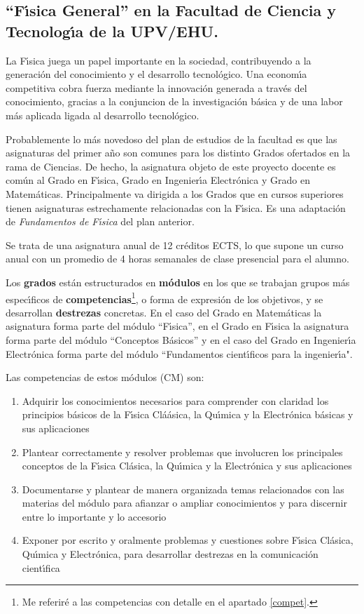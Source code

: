\subsection{ ``F\'{\i}sica General'' en la Facultad de Ciencia y Tecnolog\'{\i}a de la UPV/EHU.}


La F\'{\i}sica juega un papel importante en la sociedad, contribuyendo a 
la generaci\'{o}n del conocimiento y el desarrollo tecnol\'{o}gico.
 Una econom\'{\i}a competitiva  cobra fuerza mediante la
 innovaci\'{o}n generada a trav\'{e}s del conocimiento,
  gracias a la conjuncion de
la investigaci\'{o}n b\'{a}sica y de una labor m\'{a}s aplicada ligada al
 desarrollo tecnol\'{o}gico.


Probablemente lo m\'{a}s novedoso del  plan de estudios de la facultad
es que las asignaturas del primer a\~{n}o  son comunes
para los distinto Grados ofertados en la rama de Ciencias.
De hecho, la asignatura objeto de este proyecto docente es com\'{u}n al
Grado en F\'{\i}sica, Grado en Ingenier\'{\i}a Electr\'{o}nica y Grado en 
 Matem\'{a}ticas.
Principalmente va dirigida  a los Grados  que en cursos
superiores tienen asignaturas
estrechamente relacionadas con la F\'{\i}sica.
Es una adaptaci\'{o}n de {\it Fundamentos de F\'{\i}sica} del
plan anterior.

Se trata de una asignatura  anual de 12 cr\'{e}ditos ECTS, lo 
que supone  un curso anual con un promedio de 
 4 horas semanales de clase presencial para el alumno. 

Los {\bf grados} est\'{a}n estructurados en {\bf m\'{o}dulos}
 en los que se trabajan grupos 
m\'{a}s espec\'{\i}ficos de {\bf competencias}\footnote{Me referir\'{e}
 a las competencias con detalle en el apartado \ref{compet}.},
 o forma de expresi\'{o}n de
 los objetivos,
y se desarrollan {\bf destrezas} concretas.
En el caso del Grado en Matem\'{a}ticas la asignatura forma parte del m\'{o}dulo
 ``F\'{\i}sica'', en el Grado en F\'{\i}sica la asignatura forma parte del m\'{o}dulo
 ``Conceptos
B\'{a}sicos'' y en el caso del Grado en  
Ingenier\'{\i}a Electr\'{o}nica forma parte del m\'{o}dulo
``Fundamentos cient\'{\i}ficos para la ingenier\'{\i}a".


Las competencias de estos m\'{o}dulos (CM) son:
\begin{enumerate} [CM01:]
\item Adquirir los conocimientos necesarios para comprender con claridad los 
principios b\'{a}sicos de la F\'{\i}sica
Cl\'{a}ásica, la Qu\'{\i}mica y la Electr\'{o}nica b\'{a}sicas y sus aplicaciones
\item  Plantear correctamente y resolver problemas que involucren los principales conceptos de la F\'{\i}sica Cl\'{a}sica,
la Qu\'{\i}mica y la Electr\'{o}nica y sus aplicaciones
\item Documentarse y plantear de manera organizada temas relacionados con las 
materias del m\'{o}dulo para afianzar o
ampliar conocimientos y para discernir entre lo importante y lo accesorio
\item Exponer por escrito y oralmente problemas y cuestiones sobre F\'{\i}sica 
Cl\'{a}sica, Qu\'{\i}mica y Electr\'{o}nica, para
desarrollar destrezas en la comunicaci\'{o}n cient\'{\i}fica
\end{enumerate}


